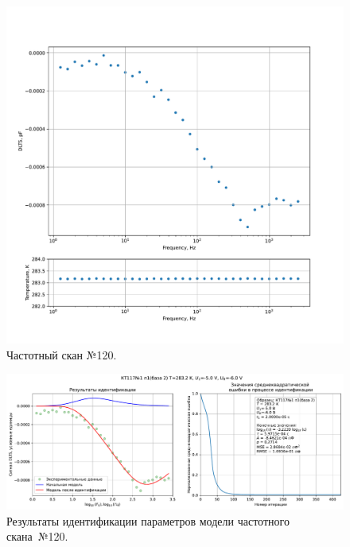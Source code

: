\begin{figure}[!ht]
    \centering
    \includegraphics[width=1\textwidth]{../plots/КТ117№1_п1(база 2)_2500Гц-1Гц_1пФ_+10С_-5В-6В_10мВ_20мкс_шаг_0,1.pdf}
    \caption{Частотный скан №120.}
    \label{pic:frequency_scan_120}
\end{figure}

\begin{figure}[!ht]
    \centering
    \includegraphics[width=1\textwidth]{../plots/КТ117№1_п1(база 2)_2500Гц-1Гц_1пФ_+10С_-5В-6В_10мВ_20мкс_шаг_0,1_model.pdf}
    \caption{Результаты идентификации параметров модели частотного скана~№120.}
    \label{pic:frequency_scan_model120}
\end{figure}

\pagebreak



